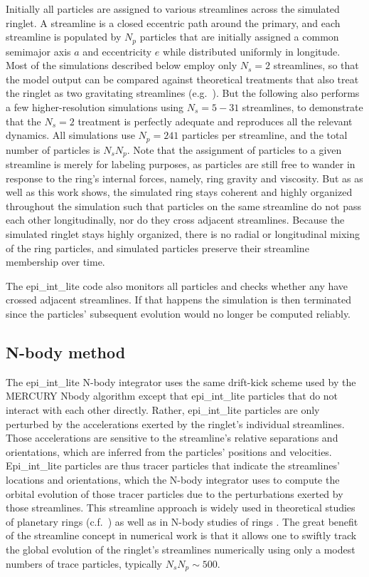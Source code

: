 \documentclass[preprint]{aastex62}
\begin{document}
Initially all particles are assigned to various streamlines across the simulated ringlet. A streamline
is a closed eccentric path around the primary, and each streamline is populated by $N_p$ particles that are
initially assigned a common semimajor axis $a$ and eccentricity $e$ while
distributed uniformly in longitude. Most of the simulations described below
employ only $N_s=2$ streamlines, so that the model output can be compared against
theoretical treatments that also treat the ringlet as two gravitating streamlines
(e.g.\ \citealt{BGT83}). But the following also performs a few higher-resolution simulations
using $N_s=5-31$ streamlines, to demonstrate that the $N_s=2$ treatment is perfectly
adequate and reproduces all the relevant dynamics. All simulations use $N_p=241$ particles 
per streamline, and the total number of particles is $N_sN_p$.
Note that the assignment of particles to a given streamline is merely
for labeling purposes, as particles are still free to wander in response
to the ring’s internal forces, namely, ring gravity and viscosity. But as \cite{HS13} as well
as this work shows, the simulated ring stays coherent and highly organized throughout the 
simulation such that particles on the same streamline do not pass each other longitudinally,
nor do they cross adjacent streamlines. Because the simulated ringlet stays highly organized,
there is no radial or longitudinal mixing of the ring particles, and simulated particles preserve
their streamline membership over time. 

The epi\_int\_lite code also monitors all particles and checks whether any have crossed adjacent streamlines.
If that happens the simulation is then terminated since the particles' subsequent evolution
would no longer be computed reliably.

\subsection{N-body method}
\label{subsec:N-body method}

The epi\_int\_lite N-body integrator uses the same drift-kick
scheme used by the MERCURY Nbody algorithm \citep{C99} except that
epi\_int\_lite particles that do not interact with each other directly.
Rather, epi\_int\_lite particles
are only perturbed by the accelerations exerted by the ringlet's individual streamlines. 
Those accelerations are sensitive to the streamline's relative separations and orientations, 
which are inferred from the particles' positions
and velocities. Epi\_int\_lite particles are thus tracer particles
that indicate the streamlines' locations and orientations, which the N-body
integrator uses to compute the orbital evolution of those tracer particles
due to the perturbations exerted by those streamlines. This streamline approach 
is widely used in theoretical studies of planetary rings (c.f.\ \citealt{GT79, BGT83, BGT85})
as well as in N-body studies of rings \citep{HS13, RHH16}. The great benefit of the streamline concept
in numerical work is that it allows one to swiftly track the 
global evolution of the ringlet's streamlines numerically
using only a modest numbers of trace particles, typically $N_sN_p\sim500$.
\end{document}

